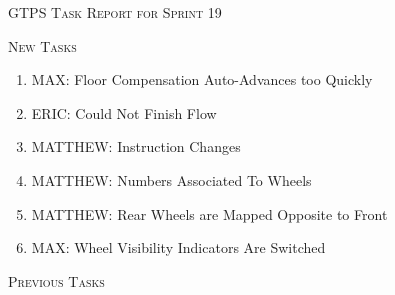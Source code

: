 


\begin{center}

\Large

\textsc{GTPS Task Report for Sprint 19}\

\normalsize \DTMnow

\end{center}\vspace{1.5cm}
\large

\textsc{{New Tasks}}

\normalsize
\begin{enumerate}[leftmargin=!,labelindent=5pt,itemindent=-35pt]
\item {} MAX: Floor Compensation Auto-Advances too Quickly
\item {} ERIC: Could Not Finish Flow
\item {} MATTHEW: Instruction Changes
\item {} MATTHEW: Numbers Associated To Wheels
\item {} MATTHEW: Rear Wheels are Mapped Opposite to Front
\item {} MAX: Wheel Visibility Indicators Are Switched
\end{enumerate}\vspace{.5cm}
\large

\textsc{{Previous Tasks}}

